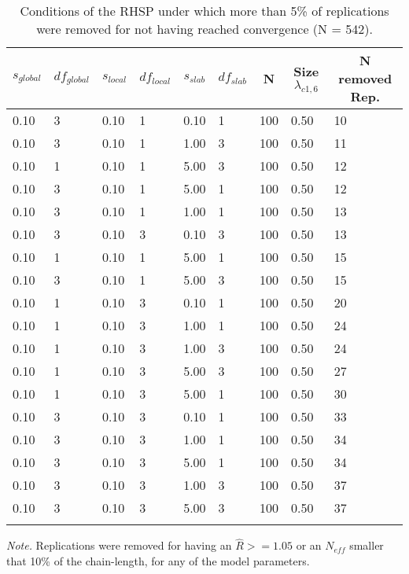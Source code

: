 \documentclass[]{interact}
\theoremstyle{plain}%
\theoremstyle{definition}
\theoremstyle{remark}
\begin{document}
\begin{table}[tbp]

\begin{center}
\begin{threeparttable}

\caption{\label{tab:unnamed-chunk-3}Conditions of the RHSP under which more than 5\% of replications were removed for not having reached convergence (N = 542).}

\begin{tabular}{lllllllll}
\toprule
$s_{global}$ & \multicolumn{1}{c}{$df_{global}$} & \multicolumn{1}{c}{$s_{local}$} & \multicolumn{1}{c}{$df_{local}$} & \multicolumn{1}{c}{$s_{slab}$} & \multicolumn{1}{c}{$df_{slab}$} & \multicolumn{1}{c}{N} & \multicolumn{1}{c}{Size $\lambda_{c1 , 6}$} & \multicolumn{1}{c}{N removed Rep.}\\
\midrule
0.10 & 3 & 0.10 & 1 & 0.10 & 1 & 100 & 0.50 & 10\\
0.10 & 3 & 0.10 & 1 & 1.00 & 3 & 100 & 0.50 & 11\\
0.10 & 1 & 0.10 & 1 & 5.00 & 3 & 100 & 0.50 & 12\\
0.10 & 3 & 0.10 & 1 & 5.00 & 1 & 100 & 0.50 & 12\\
0.10 & 3 & 0.10 & 1 & 1.00 & 1 & 100 & 0.50 & 13\\
0.10 & 3 & 0.10 & 3 & 0.10 & 3 & 100 & 0.50 & 13\\
0.10 & 1 & 0.10 & 1 & 5.00 & 1 & 100 & 0.50 & 15\\
0.10 & 3 & 0.10 & 1 & 5.00 & 3 & 100 & 0.50 & 15\\
0.10 & 1 & 0.10 & 3 & 0.10 & 1 & 100 & 0.50 & 20\\
0.10 & 1 & 0.10 & 3 & 1.00 & 1 & 100 & 0.50 & 24\\
0.10 & 1 & 0.10 & 3 & 1.00 & 3 & 100 & 0.50 & 24\\
0.10 & 1 & 0.10 & 3 & 5.00 & 3 & 100 & 0.50 & 27\\
0.10 & 1 & 0.10 & 3 & 5.00 & 1 & 100 & 0.50 & 30\\
0.10 & 3 & 0.10 & 3 & 0.10 & 1 & 100 & 0.50 & 33\\
0.10 & 3 & 0.10 & 3 & 1.00 & 1 & 100 & 0.50 & 34\\
0.10 & 3 & 0.10 & 3 & 5.00 & 1 & 100 & 0.50 & 34\\
0.10 & 3 & 0.10 & 3 & 1.00 & 3 & 100 & 0.50 & 37\\
0.10 & 3 & 0.10 & 3 & 5.00 & 3 & 100 & 0.50 & 37\\
\bottomrule
\addlinespace
\end{tabular}

\begin{tablenotes}[para]
\normalsize{\textit{Note.} Replications were removed for having an $\hat{R} >= 1.05$ or an $N_{eff}$  smaller that 10\% of the chain-length, for any of the model parameters.}
\end{tablenotes}

\end{threeparttable}
\end{center}

\end{table}
\end{document}
